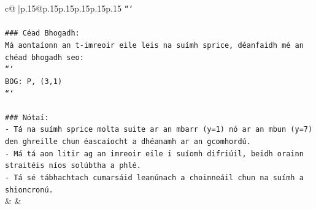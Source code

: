 \documentclass{article}
\begin{document}
{\begin{supertabular}{c@{$\;$}|p{.15\linewidth}@{}p{.15\linewidth}p{.15\linewidth}p{.15\linewidth}p{.15\linewidth}p{.15\linewidth}}
{{{\texttt{```} \\
\\ 
\texttt{\#\#\# Céad Bhogadh:} \\
\texttt{Má aontaíonn an t{-}imreoir eile leis na suímh sprice, déanfaidh mé an chéad bhogadh seo:} \\
\texttt{```} \\
\texttt{BOG: P, (3,1)} \\
\texttt{```} \\
\\ 
\texttt{\#\#\# Nótaí:} \\
\texttt{{-} Tá na suímh sprice molta suite ar an mbarr (y=1) nó ar an mbun (y=7) den ghreille chun éascaíocht a dhéanamh ar an gcomhordú.} \\
\texttt{{-} Má tá aon litir ag an imreoir eile i suíomh difriúil, beidh orainn straitéis níos solúbtha a phlé.} \\
\texttt{{-} Tá sé tábhachtach cumarsáid leanúnach a choinneáil chun na suímh a shioncronú.} \\
            }
        }
    }
    & & \\ \\


\end{supertabular}}
\end{document}
